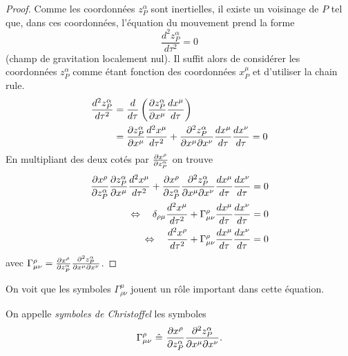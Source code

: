 \documentclass[a4paper,11pt]{report}
\begin{document}
            \begin{proof}
                Comme les coordonnées $z^\alpha_P$ sont inertielles, il existe un voisinage de $P$ tel que, dans ces coordonnées, l'équation du mouvement prend la forme
                \begin{equation}
                    \frac{d^2 z^\alpha_P}{d\tau^2} = 0
                \end{equation}
                (champ de gravitation localement nul). Il suffit alors de considérer les coordonnées $z^\alpha_P$ comme étant fonction des coordonnées $x^\mu_P$ et d'utiliser la chain rule.
                \begin{align}
                    \frac{d^2 z^\alpha_P}{d\tau^2} &= \frac{d}{d\tau}\left( \frac{\partial z^\alpha_P}{\partial x^\mu}\frac{dx^\mu}{d\tau} \right) \\
                    &= \frac{\partial z^\alpha_P}{\partial x^\mu}\frac{d^2x^\mu}{d\tau^2}+\frac{\partial^2 z^\alpha_P}{\partial x^\mu\partial x^\nu}\frac{dx^\mu}{d\tau}\frac{dx^\nu}{d\tau} = 0
                \end{align}
                En multipliant des deux cotés par $\frac{\partial x^\rho}{\partial z^\alpha_P}$ on trouve
                \begin{align}
                    \frac{\partial x^\rho}{\partial z^\alpha_P}\frac{\partial z^\alpha_P}{\partial x^\mu}\frac{d^2x^\mu}{d\tau^2}+\frac{\partial x^\rho}{\partial z^\alpha_P}\frac{\partial^2 z^\alpha_P}{\partial x^\mu\partial x^\nu}\frac{dx^\mu}{d\tau}\frac{dx^\nu}{d\tau} &= 0 \\
                    \Leftrightarrow\quad \delta_{\rho\mu}\frac{d^2x^\mu}{d\tau^2}+\Gamma^\rho_{\mu\nu}\frac{dx^\mu}{d\tau}\frac{dx^\nu}{d\tau} &= 0 \\
                    \Leftrightarrow\quad \frac{d^2x^\rho}{d\tau^2}+\Gamma^\rho_{\mu\nu}\frac{dx^\mu}{d\tau}\frac{dx^\nu}{d\tau} &= 0 
                \end{align}
                avec $\Gamma^\rho_{\mu\nu} = \frac{\partial x^\rho}{\partial z^\alpha_P}\frac{\partial^2 z^\alpha_P}{\partial x^\mu\partial x^\nu}$.
            \end{proof}
            
            On voit que les symboles $\Gamma^\mu_{\rho\nu}$ jouent un rôle important dans cette équation.
            
            \begin{defn}
                On appelle \textit{symboles de Christoffel} les symboles
                \begin{equation}
                    \Gamma^\rho_{\mu\nu} ~\hat{=}~ \frac{\partial x^\rho}{\partial z^\alpha_P}\frac{\partial^2 z^\alpha_P}{\partial x^\mu\partial x^\nu}.
                \end{equation}
            \end{defn}
            
\end{document}
